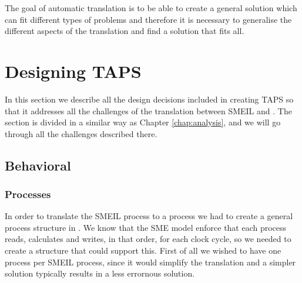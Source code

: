 The goal of automatic translation is to be able to create a general solution which can fit different types of problems and therefore it is necessary to generalise the different aspects of the translation and find a solution that fits all.
\section{Designing TAPS}
In this section we describe all the design decisions included in creating TAPS so that it addresses all the challenges of the translation between SMEIL and \cspm{}. The section is divided in a similar way as Chapter \ref{chap:analysis}, and we will go through all the challenges described there.
\subsection{Behavioral}

\subsubsection{Processes}
In order to translate the SMEIL process to a \cspm{} process we had to create a general process structure in \cspm{}. We know that the SME model enforce that each process reads, calculates and writes, in that order, for each clock cycle, so we needed to create a \cspm{} structure that could support this. First of all we wished to have one \cspm{} process per SMEIL process, since it would simplify the translation and a simpler solution typically results in a less errornous solution.

